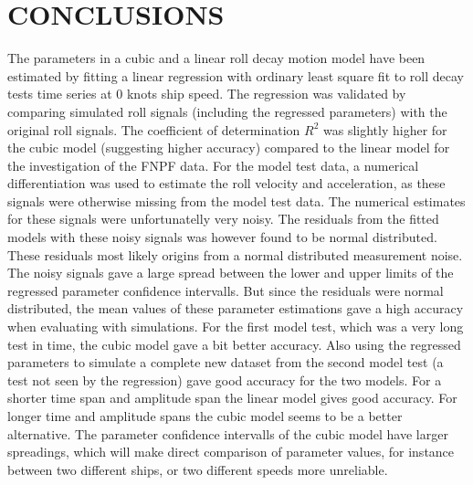 \section*{CONCLUSIONS}\label{conclusions}
The parameters in a cubic and a linear roll decay motion model have been
estimated by fitting a linear regression with ordinary least square fit
to roll decay tests time series at 0 knots ship speed. The regression
was validated by comparing simulated roll signals (including the
regressed parameters) with the original roll signals. The coefficient of
determination $R^2$ was slightly higher for the cubic model
(suggesting higher accuracy) compared to the linear model for the
investigation of the FNPF data.
For the model test data, a numerical differentiation was used to
estimate the roll velocity and acceleration, as these signals were
otherwise missing from the model test data. The numerical estimates for
these signals were unfortunatelly very noisy. The residuals from the
fitted models with these noisy signals was however found to be normal
distributed. These residuals most likely origins from a normal
distributed measurement noise. The noisy signals gave a large spread
between the lower and upper limits of the regressed parameter confidence
intervalls. But since the residuals were normal distributed, the mean
values of these parameter estimations gave a high accuracy when
evaluating with simulations. For the first model test, which was a very
long test in time, the cubic model gave a bit better accuracy. Also
using the regressed parameters to simulate a complete new dataset from
the second model test (a test not seen by the regression) gave good
accuracy for the two models.
For a shorter time span and amplitude span the linear model gives good
accuracy. For longer time and amplitude spans the cubic model seems to
be a better alternative. The parameter confidence intervalls of the
cubic model have larger spreadings, which will make direct comparison of
parameter values, for instance between two different ships, or two
different speeds more unreliable.
